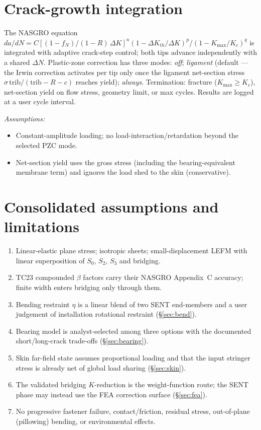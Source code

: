 \documentclass[11pt]{article}
\newenvironment{assume}{\par\smallskip\noindent\textit{Assumptions:}\begin{itemize}[leftmargin=1.5em,topsep=2pt,itemsep=1pt]}{\end{itemize}\par\smallskip}
\begin{document}
\section{Crack-growth integration}
The NASGRO equation
$da/dN=C[(1-f_N)/(1-R)\,\Delta K]^n(1-\Delta K_{th}/\Delta K)^p/(1-K_{\max}/K_c)^q$
is integrated with adaptive crack-step control; both tips advance independently
with a shared $\Delta N$. Plastic-zone correction has three modes:
\emph{off}; \emph{ligament} (default --- the Irwin correction activates per tip
only once the ligament net-section stress $\sigma\,\text{trib}/(\text{trib}-R-c)$
reaches yield); \emph{always}. Termination: fracture ($K_{\max}\ge K_c$),
net-section yield on flow stress, geometry limit, or max cycles. Results are
logged at a user cycle interval.

\begin{assume}
\item Constant-amplitude loading; no load-interaction/retardation beyond the
  selected PZC mode.
\item Net-section yield uses the gross stress (including the bearing-equivalent
  membrane term) and ignores the load shed to the skin (conservative).
\end{assume}

\section{Consolidated assumptions and limitations}
\begin{enumerate}[leftmargin=1.6em,topsep=2pt,itemsep=1pt]
\item Linear-elastic plane stress; isotropic sheets; small-displacement LEFM
  with linear superposition of $S_0$, $S_2$, $S_3$ and bridging.
\item TC23 compounded $\beta$ factors carry their NASGRO Appendix~C accuracy;
  finite width enters bridging only through them.
\item Bending restraint $\eta$ is a linear blend of two SENT end-members and a
  user judgement of installation rotational restraint (\S\ref{sec:bend}).
\item Bearing model is analyst-selected among three options with the documented
  short/long-crack trade-offs (\S\ref{sec:bearing}).
\item Skin far-field state assumes proportional loading and that the input
  stringer stress is already net of global load sharing (\S\ref{sec:skin}).
\item The validated bridging $K$-reduction is the weight-function route; the
  SENT phase may instead use the FEA correction surface (\S\ref{sec:fea}).
\item No progressive fastener failure, contact/friction, residual stress,
  out-of-plane (pillowing) bending, or environmental effects.
\end{enumerate}
\end{document}
